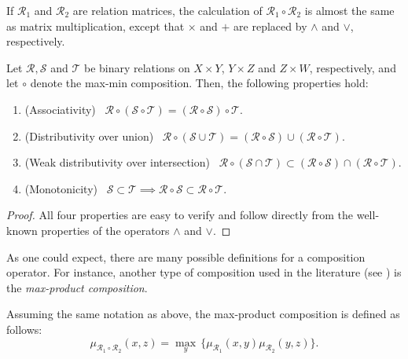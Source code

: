\begin{remark} If $\mathcal R_1$ and $\mathcal R_2$ are relation matrices, the calculation of $\mathcal R_1 \circ \mathcal R_2$ is almost the same as matrix multiplication, except that $\times$ and $+$ are replaced by $\land$ and $\lor$, respectively.

\end{remark}

\begin{prop} Let $\mathcal R, \mathcal S$ and $\mathcal T$ be binary relations on $X \times Y$, $Y \times Z$ and $Z \times W$, respectively, and let $\circ$ denote the max-min composition. Then, the following properties hold:

\begin{enumerate}
\item (Associativity) \ $\mathcal R \circ (\mathcal S \circ \mathcal T) = (\mathcal R \circ \mathcal S) \circ \mathcal T$.
\item (Distributivity  over union) \ $\mathcal R \circ (\mathcal S \cup \mathcal T) = (\mathcal R \circ \mathcal S) \cup (\mathcal R \circ \mathcal T)$.
\item (Weak distributivity over intersection) \ $\mathcal R \circ (\mathcal S \cap \mathcal T) \subset (\mathcal R \circ \mathcal S) \cap (\mathcal R \circ \mathcal T)$.
\item (Monotonicity) \ $\mathcal S \subset \mathcal T \implies \mathcal R \circ \mathcal S \subset \mathcal R \circ \mathcal T$.
\end{enumerate}

\end{prop}

\begin{proof}
  All four properties are easy to verify and follow directly from the well-known properties of the operators $\land$ and $\lor$.
\end{proof}

As one could expect, there are many possible definitions for a composition operator. For instance, another type of composition used in the literature (see \cite{markovsii2004solution, loetamonphong2001optimization}) is the \textit{max-product composition}.

\begin{definition} Assuming the same notation as above, the max-product composition is defined as follows:
\[
\mu_{\mathcal R_1 \circ \mathcal R_2}(x,z) = \max_{y} \, \{ \mu_{\mathcal R_1}(x,y) \mu_{\mathcal R_2}(y,z) \}.
\]

\end{definition}

